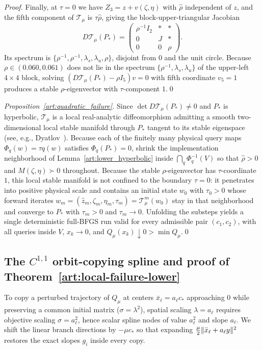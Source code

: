 \begin{proof}
Finally, at $\tau=0$ we have $Z_3=z+v(\zeta,\eta)$ with $\hat\rho$ independent of
$z$, and the fifth component of $\mathcal T_\mu$ is $\tau\hat\rho$, giving the
block-upper-triangular Jacobian
\[
 D\mathcal T_\mu(P_*)=
 \begin{pmatrix}
 \rho^{-1}I_2&*&*\\0&J&*\\0&0&\rho
 \end{pmatrix}.
\]
Its spectrum is $\{\rho^{-1},\rho^{-1},\lambda_s,\lambda_u,\rho\}$, disjoint from
$0$ and the unit circle. Because $\rho\in(0.060,0.061)$ does not lie in the
spectrum $\{\rho^{-1},\lambda_s,\lambda_u\}$ of the upper-left $4\times4$ block,
solving $(D\mathcal T_\mu(P_*)-\rho I_5)v=0$ with fifth coordinate $v_5=1$
produces a stable $\rho$-eigenvector with $\tau$-component $1$.\qed
\end{proof}

\begin{proof}[Proposition~\ref{art:quadratic_failure}]
Since $\det D\mathcal T_\mu(P_*)\ne0$ and $P_*$ is hyperbolic, $\mathcal T_\mu$
is a local real-analytic diffeomorphism admitting a smooth two-dimensional local
stable manifold through $P_*$ tangent to its stable eigenspace (see, e.g.,
Dyatlov~). Because each
of the finitely many physical query maps $\Phi_q(w)=\tau q(w)$ satisfies
$\Phi_q(P_*)=0$, shrink the implementation neighborhood of
Lemma~\ref{art:lower_hyperbolic} inside $\bigcap_q\Phi_q^{-1}(V)$ so that
$\hat\rho>0$ and $M(\zeta,\eta)\succ0$ throughout. Because the stable
$\rho$-eigenvector has $\tau$-coordinate $1$, this local stable manifold is not
confined to the boundary $\tau=0$: it penetrates into positive physical scale
and contains an initial state $w_0$ with $\tau_0>0$ whose forward iterates
$w_m=(\hat z_m,\zeta_m,\eta_m,\tau_m)=\mathcal T_\mu^m(w_0)$ stay in that
neighborhood and converge to $P_*$ with $\tau_m>0$ and $\tau_m\to0$. Unfolding
the substeps yields a single deterministic full-BFGS run valid for every
admissible pair $(c_1,c_2)$, with all queries inside $V$, $x_k\to0$, and
$Q_\mu(x_k)\downarrow0>\min Q_\mu$.\qed
\end{proof}

\subsection{The $C^{1,1}$ orbit-copying spline and proof of Theorem~\ref{art:local-failure-lower}}

To copy a perturbed trajectory of $Q_\mu$ at centers $\bar x_\ell=a_\ell c_*$
approaching $0$ while preserving a common initial matrix ($\sigma=\lambda^2$),
spatial scaling $\lambda=a_\ell$ requires objective scaling $\sigma=a_\ell^2$,
hence scalar spline nodes of value $a_\ell^2$ and slope $a_\ell$. We shift the
linear branch directions by $-\mu c_*$ so that expanding $\tfrac\mu2\lVert\bar x_\ell+a_\ell y\rVert^2$
restores the exact slopes $g_i$ inside every copy.

